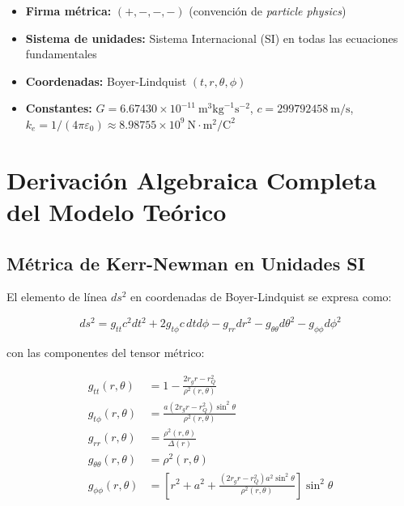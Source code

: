 \documentclass[12pt,a4paper]{article}
\begin{document}
\begin{itemize}
    \item \textbf{Firma métrica:} $(+,-,-,-)$ (convención de \textit{particle physics})
    \item \textbf{Sistema de unidades:} Sistema Internacional (SI) en todas las ecuaciones fundamentales
    \item \textbf{Coordenadas:} Boyer-Lindquist $(t, r, \theta, \phi)$
    \item \textbf{Constantes:} $G = 6.67430 \times 10^{-11} \ \text{m}^3 \text{kg}^{-1} \text{s}^{-2}$, $c = 299792458 \ \text{m/s}$, $k_e = 1/(4\pi\varepsilon_0) \approx 8.98755 \times 10^9 \ \text{N}\cdot\text{m}^2/\text{C}^2$
\end{itemize}

\section{Derivación Algebraica Completa del Modelo Teórico}

\subsection{Métrica de Kerr-Newman en Unidades SI}

El elemento de línea $ds^2$ en coordenadas de Boyer-Lindquist se expresa como:

\begin{equation}
ds^2 = g_{tt} c^2 dt^2 + 2 g_{t\phi} c \, dt d\phi - g_{rr} dr^2 - g_{\theta\theta} d\theta^2 - g_{\phi\phi} d\phi^2
\end{equation}

con las componentes del tensor métrico:

\begin{align}
g_{tt}(r,\theta) &= 1 - \frac{2r_g r - r_Q^2}{\rho^2(r,\theta)} \\
g_{t\phi}(r,\theta) &= \frac{a (2r_g r - r_Q^2) \sin^2\theta}{\rho^2(r,\theta)} \\
g_{rr}(r,\theta) &= \frac{\rho^2(r,\theta)}{\Delta(r)} \\
g_{\theta\theta}(r,\theta) &= \rho^2(r,\theta) \\
g_{\phi\phi}(r,\theta) &= \left[ r^2 + a^2 + \frac{(2r_g r - r_Q^2) a^2 \sin^2\theta}{\rho^2(r,\theta)} \right] \sin^2\theta
\end{align}
\end{document}
